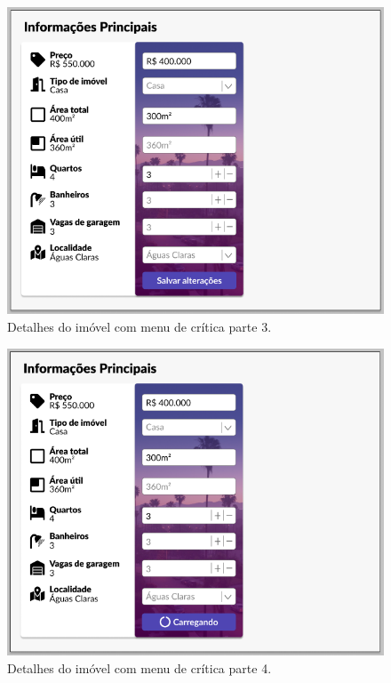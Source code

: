 \begin{figure}[H]
    \centering
    \includegraphics[scale=0.5]{figuras/proposta/prototipo3.jpg}
    \caption[Detalhes do imóvel com menu de crítica parte 3]{Detalhes do imóvel com menu de crítica parte 3.}
    \label{fig:prototipo_critico3}
\end{figure}

\begin{figure}[H]
    \centering
    \includegraphics[scale=0.5]{figuras/proposta/prototipo4.jpg}
    \caption[Detalhes do imóvel com menu de crítica parte 4]{Detalhes do imóvel com menu de crítica parte 4.}
    \label{fig:prototipo_critico4}
\end{figure}

